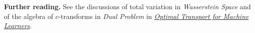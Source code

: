 \documentclass[11pt,a4paper]{article}
\theoremstyle{exostyle}
\begin{document}
\par\addvspace{7pt}
\textbf{Further reading.}
See the discussions of total variation in \emph{Wasserstein Space}
and of the algebra of $c$-transforms in \emph{Dual Problem} in
\href{https://www.gpeyre.com/ot4ml/OT4ML/OT4ML.pdf}
     {\emph{Optimal Transport for Machine Learners}}.
\end{document}
